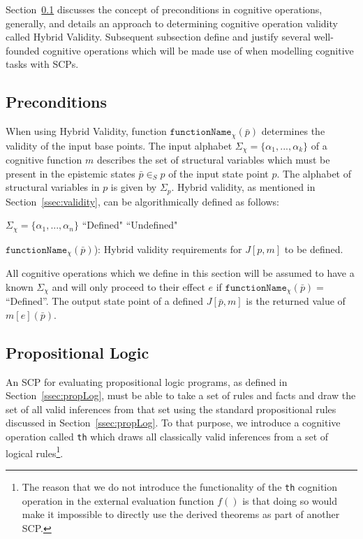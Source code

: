 Section~\ref{ssec:precon} discusses the concept of preconditions in cognitive operations, generally, and details an approach to determining cognitive operation validity called Hybrid Validity. Subsequent subsection define and justify several well-founded cognitive operations which will be made use of when modelling cognitive tasks with SCPs.

\subsection{Preconditions}\label{ssec:precon}

When using Hybrid Validity, function $\texttt{functionName}_\chi(\bar{p})$ determines the validity of the input base points. The input alphabet $\Sigma_\chi=\{\alpha_1, ..., \alpha_k\}$ of a cognitive function $m$ describes the set of structural variables which must be present in the epistemic states $\bar{p} \in_S p$ of the input state point $p$. The alphabet of structural variables in $p$ is given by $\Sigma_p$. Hybrid validity, as mentioned in Section~\ref{ssec:validity}, can be algorithmically defined as follows:

\begin{algorithm}[H] 
\SetAlgoLined
{}
{
$\Sigma_{\chi}=\{\alpha_1,...,\alpha_n\}$\;
{
\Return ``Defined"
}
{
\Return ``Undefined"
}
}

\caption{$\texttt{functionName}_\chi(\bar{p})$): Hybrid validity requirements for $J[p,m]$ to be defined.}
\label{cogOp:precon}
\end{algorithm}

All cognitive operations which we define in this section will be assumed to have a known $\Sigma_\chi$ and will only proceed to their effect $e$ if $\texttt{functionName}_\chi(\bar{p})=$ ``Defined''.
The output state point of a defined $J[\bar{p},m]$ is the returned value of $m[e](\bar{p})$.

\subsection{Propositional Logic}
An SCP for evaluating propositional logic programs, as defined in Section~\ref{ssec:propLog}, must be able to take a set of rules and facts and draw the set of all valid inferences from that set using the standard propositional rules discussed in Section~\ref{ssec:propLog}. To that purpose, we introduce a cognitive operation called \texttt{th} which draws all classically valid inferences from a set of logical rules\footnote{The reason that we do not introduce the functionality of the \texttt{th} cognition operation in the external evaluation function $f()$ is that doing so would make it impossible to directly use the derived theorems as part of another SCP.}.

